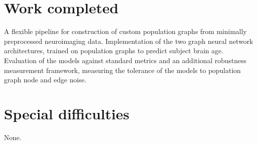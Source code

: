 \section*{Work completed}
A flexible pipeline for construction of custom population graphs from minimally preprocessed neuroimaging data. Implementation of the two graph neural network architectures, trained on population graphs to predict subject brain age. Evaluation of the models against standard metrics and an additional robustness measurement framework, measuring the tolerance of the models to population graph node and edge noise.

\section*{Special difficulties}

None.

\tableofcontents


